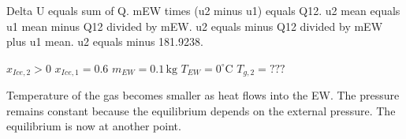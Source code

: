 Delta U equals sum of Q.  
mEW times (u2 minus u1) equals Q12.  
u2 mean equals u1 mean minus Q12 divided by mEW.  
u2 equals minus Q12 divided by mEW plus u1 mean.  
u2 equals minus 181.9238.

\( x_{Ice,2} > 0 \)  
\( x_{Ice,1} = 0.6 \)  
\( m_{EW} = 0.1 \, \text{kg} \)  
\( T_{EW} = 0^\circ \text{C} \)  
\( T_{g,2} = ??? \)  

Temperature of the gas becomes smaller as heat flows into the EW. The pressure remains constant because the equilibrium depends on the external pressure.  
The equilibrium is now at another point.